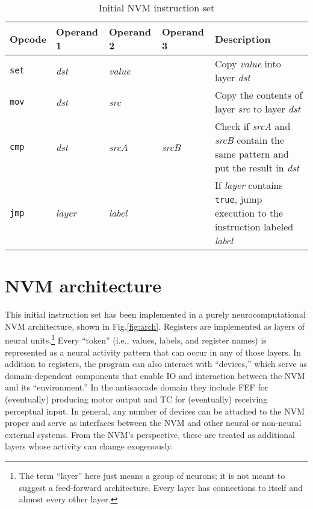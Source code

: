 \documentclass[pdftex,12pt,letterpaper]{article}
\begin{document}
\begin{table}[H]
\begin{tabularx}{\textwidth}{llllX}
Opcode & Operand 1 & Operand 2 & Operand 3 & Description \\
\hline
\texttt{set} & \textit{dst} & \textit{value} & & Copy \textit{value} into layer \textit{dst} \\
\texttt{mov} & \textit{dst} & \textit{src} & & Copy the contents of layer \textit{src} to layer \textit{dst} \\
\texttt{cmp} & \textit{dst} & \textit{srcA} & \textit{srcB} & Check if \textit{srcA} and \textit{srcB} contain the same pattern and put the result in \textit{dst} \\
\texttt{jmp} & \textit{layer} & \textit{label} & & If \textit{layer} contains \texttt{true}, jump execution to the instruction labeled \textit{label} \\
\end{tabularx}
\caption{Initial NVM instruction set}
\label{tbl:inst}
\end{table}

\section{NVM architecture}

This initial instruction set has been implemented in a purely neurocomputational NVM architecture, shown in Fig.\@ \ref{fig:arch}.  Registers are implemented as layers of neural units.\footnote{The term ``layer'' here just means a group of neurons; it is not meant to suggest a feed-forward architecture.  Every layer has connections to itself and almost every other layer.}  Every ``token'' (i.e., values, labels, and register names) is represented as a neural activity pattern that can occur in any of those layers.  In addition to registers, the program can also interact with ``devices,'' which serve as domain-dependent components that enable IO and interaction between the NVM and its ``environment.''  In the antisaccade domain they include FEF for (eventually) producing motor output and TC for (eventually) receiving perceptual input.  In general, any number of devices can be attached to the NVM proper and serve as interfaces between the NVM and other neural or non-neural external systems.  From the NVM's perspective, these are treated as additional layers whose activity can change exogenously.
\end{document}
